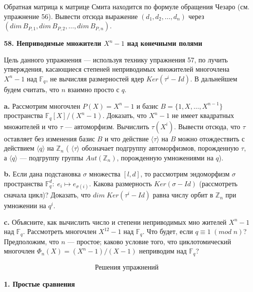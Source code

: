 \documentclass{mai_book}
\begin{document}
\medskip
\noindent Обратная матрица к матрице Смита находится по формуле обращения
Чезаро (см. упражнение 56). Вывести отсюда выражение $(d_1, d_2,\dots , d_n)$ через $(dim\,B_{P,1}, dim\,B_{P,2},\dots , dim\,B_{P,n})$.


\bigskip
\noindent\textbf{58. Неприводимые множители $X^n-1$ над конечными полями}

\medskip
Цель данного упражнения --- используя технику упражнения 57, по­
лучить утверждения, касающиеся степеней неприводимых множителей
многочлена $X^n-1$ над $\mathbb{F}_q$, не вычисляя размерностей ядер $Ker(\tau^i-Id)$.
В дальнейшем будем считать, что $n$ взаимно просто с $q$.

\smallskip
\textbf{a.} Рассмотрим многочлен $P(X)=X^n-1$ и базис $B=\{1, X,\dots , X^{n-1}\}$ пространства $\mathbb{F}_q[X]/(X^n-1)$. 
Доказать, что $X^n-1$ не имеет квадратных множителей и что $\tau$ --- автоморфизм.
Вычислить $\tau(X^i)$.
Вывести отсюда, что $\tau$ оставляет без изменения базис $B$ и что действие $\langle \tau \rangle$ на $B$ можно отождествить с действием $\langle q \rangle$ на $\mathbb{Z}_n$ ( $\langle \tau \rangle$ обозначает
подгруппу автоморфизмов, порожденную $\tau$, а $\langle q \rangle$ --- подгруппу группы $Aut(\mathbb{Z}_n)$, порожденную умножениями на $q$).

\smallskip
\textbf{b.}  Если дана подстановка $\sigma$ множества $[l,d]$, то рассмотрим эндо­морфизм $\sigma$ пространства $\mathbb{F}^d_q:\; e_i \mapsto e_{\sigma (i)}$. 
Какова размерность $Ker(\sigma-Id)$ (рассмотреть сначала цикл)? 
Доказать, что $dim\;Ker(\tau^i-Id)$ равна числу орбит в $\mathbb{Z}_n$ при умножении на $q^i$.

\smallskip
\textbf{c.} Объясните, как вычислить число и степени неприводимых мно­
жителей $X^n-1$ над $\mathbb{F}_q$. 
Рассмотреть многочлен $X^{12}-1$ над $\mathbb{F}_q$. 
Что будет, если $q\equiv 1\; (mod\; n)$? 
Предположим, что $n$ --- простое; каково
условие того, что циклотомический многочлен $\Phi_n(X)=(X^n-1)/(X-1)$ неприводим над $\mathbb{F}_q$?

\newpage

\thispagestyle{empty}

\bigskip



$$
\begin{aligned}
\textbf{Решения упражнений}
\end{aligned}
$$



\bigskip
\bigskip
\noindent\textbf{1. Простые сравнения}
\end{document}
